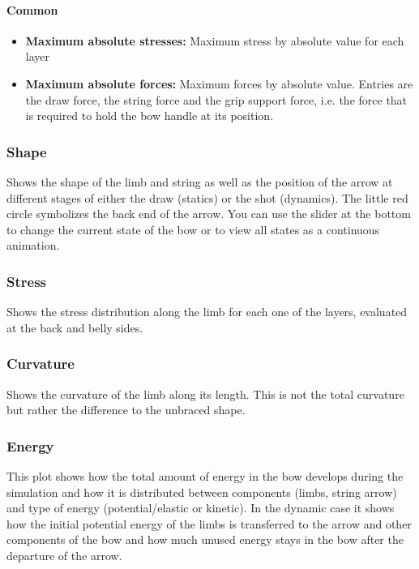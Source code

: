 \documentclass[12pt]{article}
\begin{document}
\paragraph*{Common}

\begin{itemize}
\item \textbf{Maximum absolute stresses:} Maximum stress by absolute value for each layer
\item \textbf{Maximum absolute forces:} Maximum forces by absolute value. Entries are the draw force, the string force and the grip support force, i.e. the force that is required to hold the bow handle at its position.
\end{itemize}

\subsubsection{Shape} Shows the shape of the limb and string as well as the position of the arrow at different stages of either the draw (statics) or the shot (dynamics).
The little red circle symbolizes the back end of the arrow.
You can use the slider at the bottom to change the current state of the bow or to view all states as a continuous animation.

\subsubsection{Stress} Shows the stress distribution along the limb for each one of the layers, evaluated at the back and belly sides.

\subsubsection{Curvature} Shows the curvature of the limb along its length.
This is not the total curvature but rather the difference to the unbraced shape.

\subsubsection{Energy} This plot shows how the total amount of energy in the bow develops during the simulation and how it is distributed between components (limbs, string arrow) and type of energy (potential/elastic or kinetic).
In the dynamic case it shows how the initial potential energy of the limbs is transferred to the arrow and other components of the bow and how much unused energy stays in the bow after the departure of the arrow.
\end{document}
